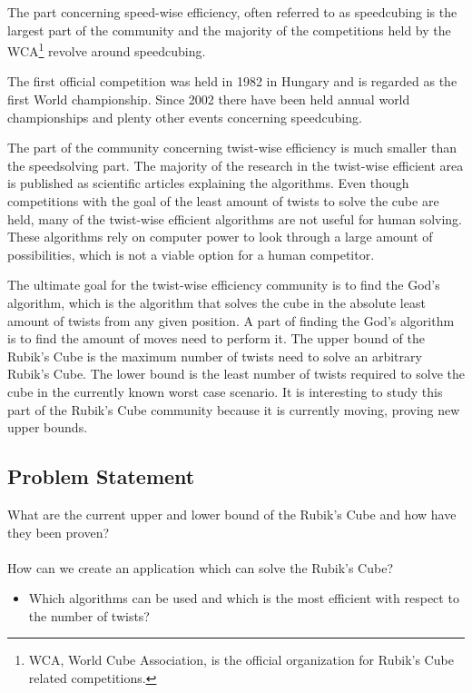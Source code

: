 \documentclass{article}
\begin{document}
The part concerning speed-wise efficiency, often referred to as speedcubing is the largest part of the community and the majority of the competitions held by the WCA\footnote{WCA, World Cube Association, is the official organization for Rubik's Cube related competitions.} revolve around speedcubing.

The first official competition was held in 1982 in Hungary and is regarded as the first World championship. Since 2002 there have been held annual world championships and plenty other events concerning speedcubing. 

The part of the community concerning twist-wise efficiency is much smaller than the speedsolving part. The majority of the research in the twist-wise efficient area is published as scientific articles explaining the algorithms. Even though competitions with the goal of the least amount of twists to solve the cube are held, many of the twist-wise efficient algorithms are not useful for human solving. These algorithms rely on computer power to look through a large amount of possibilities, which is not a viable option for a human competitor.

The ultimate goal for the twist-wise efficiency community is to find the God's algorithm, which is the algorithm that solves the cube in the absolute least amount of twists from any given position. A part of finding the God's algorithm is to find the amount of moves need to perform it. 
The upper bound of the Rubik's Cube is the maximum number of twists need to solve an arbitrary Rubik's Cube.
The lower bound is the least number of twists required to solve the cube in the currently known worst case scenario. It is interesting to study this part of the Rubik's Cube community because it is currently moving, proving new upper bounds.

\subsection{Problem Statement}
What are the current upper and lower bound of the Rubik's Cube and how have they been proven? \\
\\
How can we create an application which can solve the Rubik's Cube?
\begin{itemize}
	\item Which algorithms can be used and which is the most efficient with respect to the number of twists?
\end{itemize}
\end{document}
